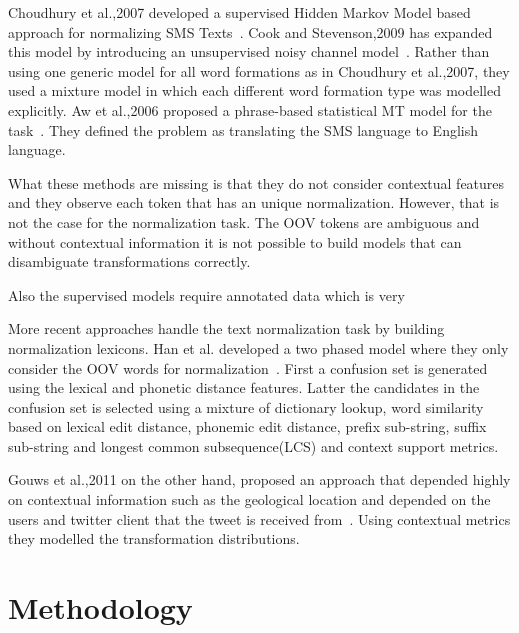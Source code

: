 \documentclass[preprint,review,12pt]{elsarticle}
\begin{document}
Choudhury et al.,2007 developed a supervised Hidden Markov Model based approach for normalizing SMS Texts~\cite{Choudhury:2007:IMS:1326044.1326048}. Cook and Stevenson,2009 has expanded this model by introducing an unsupervised noisy channel model~\cite{Cook:2009:UMT:1642011.1642021}. Rather than using one generic model for all word formations as in Choudhury et al.,2007, they used a mixture model in which each different word formation type was modelled explicitly. Aw et al.,2006 proposed a phrase-based statistical MT model for the task~\cite{Aw:2006:PSM:1273073.1273078}. They defined the problem as translating the SMS language to English language.

What these methods are missing is that they do not consider contextual features and they observe each token that has an unique normalization. However, that is not the case for the normalization task. The OOV tokens are ambiguous and without contextual information it is not possible to build models that can disambiguate transformations correctly.

Also the supervised models require annotated data which is very

More recent approaches handle the text normalization task by building normalization lexicons. Han et al. developed a two phased model where they only consider the OOV words for normalization~\cite{Han:2011:LNS:2002472.2002520}. First a confusion set is generated using the lexical and phonetic distance features. Latter the candidates in the confusion set is selected using a mixture of dictionary lookup, word similarity based on lexical edit distance, phonemic edit distance, prefix sub-string, suffix sub-string and longest common subsequence(LCS) and context support metrics.
\cite{liu2012broad}
\cite{DBLP:conf/acl/HassanM13}

Gouws et al.,2011 on the other hand, proposed an approach that depended highly on contextual information such as the geological location and depended on the users and twitter client that the tweet is received from~\cite{Gouws:2011:CBL:2021109.2021113}. Using contextual metrics they modelled the transformation distributions.



\section{Methodology}
\label{sec:method}

\end{document}

